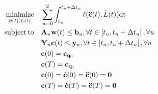 \documentclass[journal]{IEEEtran}
\newcommand{\mx}[1]{\mathbf{\bm{#1}}} 				%
\newcommand{\vc}[1]{\mathbf{\bm{#1}}} 					%
\DeclareMathOperator*{\st}{subject\,to}					%
\DeclareMathOperator*{\minimize}{minimize}				%
\providecommand{\DIFaddend}{\protect\color{black}} %
\providecommand{\DIFdelbegin}{\protect\cbdelete} %
\begin{document}
\begin{equation}
\begin{aligned}
\minimize_{\mathbf{\ddot{c}}(t), \dot{L}(t)}  \quad & \sum_{u=0}^{2} \int_{t_u}^{t_u + \Delta t_u}  \ell(\mathbf{\ddot{c}}(t), \dot{L}(t)) \text{dt}  \\
\st \quad & \mathbf{A}_u \mathbf{w}(t)  \leq \mathbf{b}_u , \forall t \in  \left[t_u, t_u + \Delta t_u \right[, \forall u \\
	\quad & \mathbf{Y}_u \mathbf{c}(t)  \leq \mathbf{y}_u , \forall t \in  \left[t_u, t_u + \Delta t_u \right[, \forall u \\
	\quad & \mathbf{c}(0)  = \mathbf{c}_{\mathbf{q}_0} \\
	\quad & \mathbf{c}(T)  = \mathbf{c}_{\mathbf{q}_1} \\
	\quad & \mathbf{c}(0)  = \mathbf{\dot{c}}(0)  = \mathbf{\ddot{c}}(0) = \mathbf{0}\\
	\quad & \mathbf{c}(T)  = \mathbf{\dot{c}}(T)  = \mathbf{\ddot{c}}(T) = \mathbf{0}\\
\end{aligned} \DIFaddend \end{equation}
\DIFdelbegin %
\end{document}
